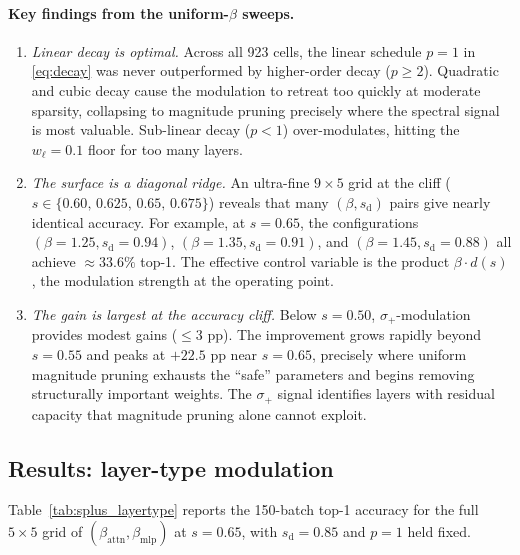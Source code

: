 \documentclass[11pt]{article}
\theoremstyle{plain}
\theoremstyle{definition}
\theoremstyle{remark}
\newcommand{\1}{\mathbf{1}}
\begin{document}
\paragraph{Key findings from the uniform-\(\beta\) sweeps.}

\begin{enumerate}[leftmargin=2em]
\item \emph{Linear decay is optimal.}  Across all 923 cells, the linear schedule \(p=1\) in \eqref{eq:decay} was never outperformed by higher-order decay (\(p\ge 2\)).  Quadratic and cubic decay cause the modulation to retreat too quickly at moderate sparsity, collapsing to magnitude pruning precisely where the spectral signal is most valuable.  Sub-linear decay (\(p<1\)) over-modulates, hitting the \(w_\ell=0.1\) floor for too many layers.

\item \emph{The surface is a diagonal ridge.}  An ultra-fine \(9\times 5\) grid at the cliff (\(s\in\{0.60,\,0.625,\,0.65,\,0.675\}\)) reveals that many \((\beta, s_{\mathrm{d}})\) pairs give nearly identical accuracy.  For example, at \(s=0.65\), the configurations \((\beta=1.25, s_{\mathrm{d}}=0.94)\), \((\beta=1.35, s_{\mathrm{d}}=0.91)\), and \((\beta=1.45, s_{\mathrm{d}}=0.88)\) all achieve \(\approx 33.6\%\) top-1.  The effective control variable is the product \(\beta \cdot d(s)\), the modulation strength at the operating point.

\item \emph{The gain is largest at the accuracy cliff.}  Below \(s=0.50\), \(\sigma_+\)-modulation provides modest gains (\({\le}3\) pp).  The improvement grows rapidly beyond \(s=0.55\) and peaks at \(+22.5\) pp near \(s=0.65\), precisely where uniform magnitude pruning exhausts the ``safe'' parameters and begins removing structurally important weights.  The \(\sigma_+\) signal identifies layers with residual capacity that magnitude pruning alone cannot exploit.
\end{enumerate}

\subsection{Results: layer-type modulation}
\label{subsec:layertype_results}

Table~\ref{tab:splus_layertype} reports the 150-batch top-1 accuracy for the full \(5\times 5\) grid of \((\beta_{\mathrm{attn}}, \beta_{\mathrm{mlp}})\) at \(s=0.65\), with \(s_{\mathrm{d}}=0.85\) and \(p=1\) held fixed.
\end{document}
